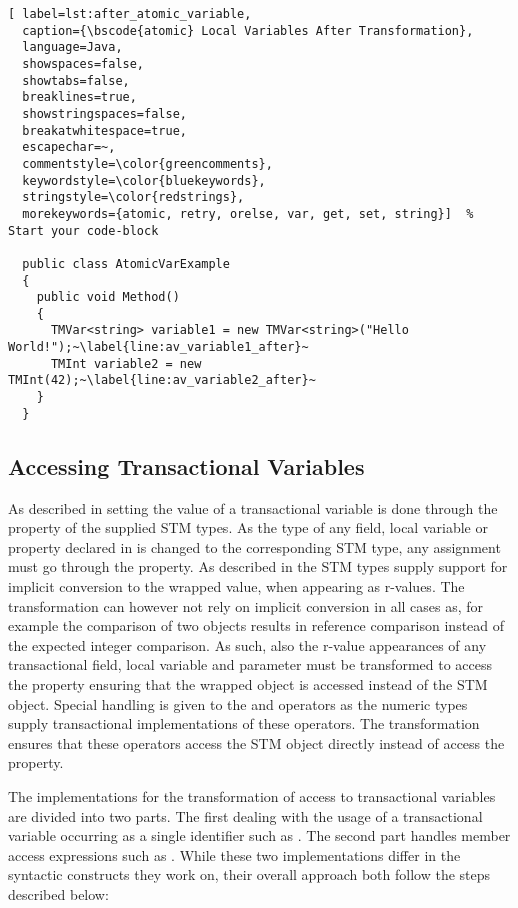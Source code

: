 \begin{lstlisting}[ label=lst:after_atomic_variable,
  caption={\bscode{atomic} Local Variables After Transformation},
  language=Java,  
  showspaces=false,
  showtabs=false,
  breaklines=true,
  showstringspaces=false,
  breakatwhitespace=true,
  escapechar=~,
  commentstyle=\color{greencomments},
  keywordstyle=\color{bluekeywords},
  stringstyle=\color{redstrings},
  morekeywords={atomic, retry, orelse, var, get, set, string}]  % Start your code-block

  public class AtomicVarExample
  {
    public void Method()
    {
      TMVar<string> variable1 = new TMVar<string>("Hello World!");~\label{line:av_variable1_after}~
      TMInt variable2 = new TMInt(42);~\label{line:av_variable2_after}~
    }
  }
\end{lstlisting}


\subsection{Accessing Transactional Variables}
\label{subsec:roslyn_extension_accessing_variables}
As described in  setting the value of a transactional variable is done through the  property of the supplied \ac{STM} types. As the type of any field, local variable or property declared  in \stmnamesp is changed to the corresponding \ac{STM} type, any assignment must go through the  property. As described in  the \ac{STM} types supply support for implicit conversion to the wrapped value, when appearing as r-values. The transformation can however not rely on implicit conversion in all cases as, for example the comparison of two  objects results in reference comparison instead of the expected integer comparison. As such, also the r-value appearances of any transactional field, local variable and parameter must be transformed to access the  property ensuring that the wrapped object is accessed instead of the \ac{STM} object. Special handling is given to the \bscode{++} and \bscode{--} operators as the numeric  types supply transactional implementations of these operators. The transformation ensures that these operators access the \ac{STM} object directly instead of access the  property.

The implementations for the transformation of access to transactional variables are divided into two parts. The first dealing with the usage of a transactional variable occurring as a single identifier such as . The second part handles member access expressions such as . While these two implementations differ in the syntactic constructs they work on, their overall approach both follow the steps described below:

